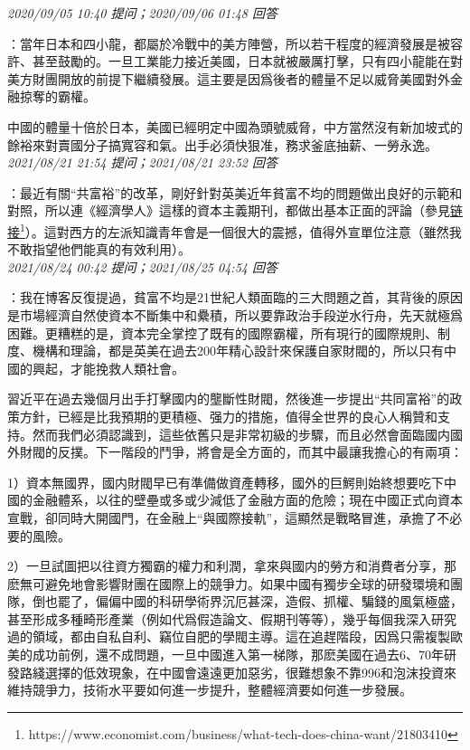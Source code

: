 \documentclass[twocolumn]{ctexart}
\begin{document}
\textit{\hfill\noindent\small 2020/09/05 10:40 提问；2020/09/06 01:48 回答}

：當年日本和四小龍，都屬於冷戰中的美方陣營，所以若干程度的經濟發展是被容許、甚至鼓勵的。一旦工業能力接近美國，日本就被嚴厲打擊，只有四小龍能在對美方財團開放的前提下繼續發展。這主要是因爲後者的體量不足以威脅美國對外金融掠奪的霸權。

中國的體量十倍於日本，美國已經明定中國為頭號威脅，中方當然沒有新加坡式的餘裕來對賣國分子搞寬容和氣。出手必須快狠准，務求釜底抽薪、一勞永逸。
\\

\textit{\hfill\noindent\small 2021/08/21 21:54 提问；2021/08/21 23:52 回答}

：最近有關“共富裕”的改革，剛好針對英美近年貧富不均的問題做出良好的示範和對照，所以連《經濟學人》這樣的資本主義期刊，都做出基本正面的評論（參見\href{https://www.economist.com/business/what-tech-does-china-want/21803410}{链接\footnote{\url{https://www.economist.com/business/what-tech-does-china-want/21803410}}}）。這對西方的左派知識青年會是一個很大的震撼，值得外宣單位注意（雖然我不敢指望他們能真的有效利用）。
\\

\textit{\hfill\noindent\small 2021/08/24 00:42 提问；2021/08/25 04:54 回答}

：我在博客反復提過，貧富不均是21世紀人類面臨的三大問題之首，其背後的原因是市場經濟自然使資本不斷集中和纍積，所以要靠政治手段逆水行舟，先天就極爲困難。更糟糕的是，資本完全掌控了既有的國際霸權，所有現行的國際規則、制度、機構和理論，都是英美在過去200年精心設計來保護自家財閥的，所以只有中國的興起，才能挽救人類社會。

習近平在過去幾個月出手打擊國内的壟斷性財閥，然後進一步提出“共同富裕”的政策方針，已經是比我預期的更積極、强力的措施，值得全世界的良心人稱贊和支持。然而我們必須認識到，這些依舊只是非常初級的步驟，而且必然會面臨國内國外財閥的反撲。下一階段的鬥爭，將會是全方面的，而其中最讓我擔心的有兩項：

1）資本無國界，國内財閥早已有準備做資產轉移，國外的巨鰐則始終想要吃下中國的金融體系，以往的壁壘或多或少減低了金融方面的危險；現在中國正式向資本宣戰，卻同時大開國門，在金融上“與國際接軌”，這顯然是戰略冒進，承擔了不必要的風險。

2）一旦試圖把以往資方獨霸的權力和利潤，拿來與國内的勞方和消費者分享，那麽無可避免地會影響財團在國際上的競爭力。如果中國有獨步全球的研發環境和團隊，倒也罷了，偏偏中國的科研學術界沉厄甚深，造假、抓權、騙錢的風氣極盛，甚至形成多種畸形產業（例如代爲假造論文、假期刊等等），幾乎每個我深入研究過的領域，都由自私自利、竊位自肥的學閥主導。這在追趕階段，因爲只需複製歐美的成功前例，還不成問題，一旦中國進入第一梯隊，那麽美國在過去6、70年研發路綫選擇的低效現象，在中國會遠遠更加惡劣，很難想象不靠996和泡沫投資來維持競爭力，技術水平要如何進一步提升，整體經濟要如何進一步發展。
\end{document}
